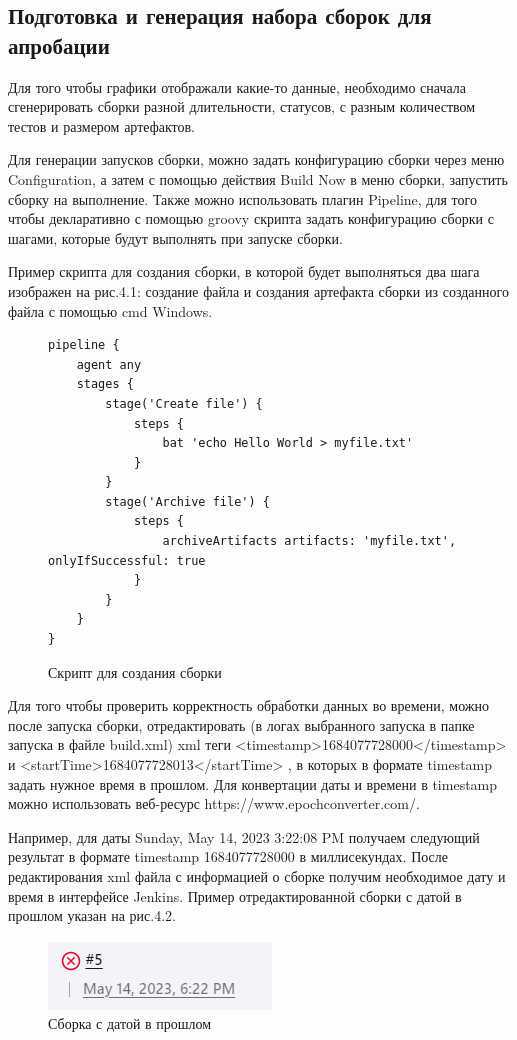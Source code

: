  \subsection{Подготовка и генерация набора сборок для апробации}
 
 Для того чтобы графики отображали какие-то данные, необходимо сначала сгенерировать сборки разной длительности, статусов, с разным количеством тестов и размером артефактов.
 
Для генерации запусков сборки, можно задать конфигурацию сборки через меню Configuration, а затем с помощью действия Build Now в меню сборки, запустить сборку на выполнение. Также можно использовать плагин Pipeline, для того чтобы декларативно с помощью groovy скрипта задать конфигурацию сборки с шагами, которые будут выполнять при запуске сборки. 

Пример скрипта для создания сборки, в которой будет выполняться два шага изображен на рис.4.1: создание файла и создания артефакта сборки из созданного файла с помощью cmd Windows.

\begin{figure}[ht!] 
	\center
	\begin{lstlisting}
pipeline {
    agent any
    stages {
        stage('Create file') {
            steps {
                bat 'echo Hello World > myfile.txt'
            }
        }
        stage('Archive file') {
            steps {
                archiveArtifacts artifacts: 'myfile.txt', onlyIfSuccessful: true
            }
        }
    }
}
\end{lstlisting}
	\caption{Скрипт для создания сборки} 
	\label{fig:lst}  
\end{figure}


Для того чтобы проверить корректность обработки данных во времени, можно после запуска сборки, отредактировать (в логах выбранного запуска в папке запуска в файле build.xml) xml теги   <timestamp>1684077728000</timestamp> и
  <startTime>1684077728013</startTime> , в которых в формате timestamp задать нужное время в прошлом. Для конвертации даты и времени в timestamp можно использовать веб-ресурс https://www.epochconverter.com/.
  
Например, для даты Sunday, May 14, 2023 3:22:08 PM получаем следующий результат в формате timestamp 1684077728000 в миллисекундах. После редактирования xml файла с информацией о сборке получим необходимое дату  и время в интерфейсе Jenkins. Пример отредактированной сборки с датой в прошлом указан на рис.4.2.

 \begin{figure}[ht!] 
	\center
	\includegraphics [scale=0.87] {my_folder/images//lastBuild}
	\caption{Сборка с датой в прошлом} 
	\label{fig:lastBuild}  
\end{figure}
 
